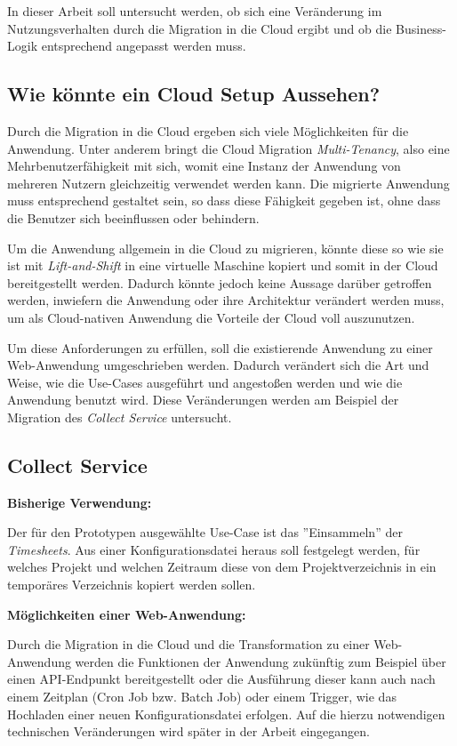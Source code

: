 In dieser Arbeit soll untersucht werden, ob sich eine Veränderung im Nutzungsverhalten durch die Migration in die Cloud ergibt und ob die Business-Logik entsprechend angepasst werden muss. \pagebreak

\subsection{Wie könnte ein Cloud Setup Aussehen?}
Durch die Migration in die Cloud ergeben sich viele Möglichkeiten für die Anwendung. Unter anderem bringt die Cloud Migration \textit{\gls{Multi-Tenancy}}, also eine Mehrbenutzerfähigkeit mit sich, womit eine Instanz der Anwendung von mehreren Nutzern gleichzeitig verwendet werden kann. Die migrierte Anwendung muss entsprechend gestaltet sein, so dass diese Fähigkeit gegeben ist, ohne dass die Benutzer sich beeinflussen oder behindern.

Um die Anwendung allgemein in die Cloud zu migrieren, könnte diese so wie sie ist mit \textit{Lift-and-Shift} in eine virtuelle Maschine kopiert und somit in der Cloud bereitgestellt werden. Dadurch könnte jedoch keine Aussage darüber getroffen werden, inwiefern die Anwendung oder ihre Architektur verändert werden muss, um als Cloud-nativen Anwendung die Vorteile der Cloud voll auszunutzen.

Um diese Anforderungen zu erfüllen, soll die existierende Anwendung zu einer Web-Anwendung umgeschrieben werden. Dadurch verändert sich die Art und Weise, wie die Use-Cases ausgeführt und angestoßen werden und wie die Anwendung benutzt wird. Diese Veränderungen werden am Beispiel der Migration des \textit{Collect Service} untersucht.

\subsection{Collect Service}
\textbf{Bisherige Verwendung:}

Der für den Prototypen ausgewählte Use-Case ist das ''Einsammeln'' der \textit{\glspl{Timesheet}}. Aus einer Konfigurationsdatei heraus soll festgelegt werden, für welches Projekt und welchen Zeitraum diese von dem Projektverzeichnis in ein temporäres Verzeichnis kopiert werden sollen. 

\textbf{Möglichkeiten einer Web-Anwendung:}

Durch die Migration in die Cloud und die Transformation zu einer Web-Anwendung werden die Funktionen der Anwendung zukünftig zum Beispiel über einen API-Endpunkt bereitgestellt oder die Ausführung dieser kann auch nach einem Zeitplan (Cron Job bzw. Batch Job) oder einem Trigger, wie das Hochladen einer neuen Konfigurationsdatei erfolgen. Auf die hierzu notwendigen technischen Veränderungen wird später in der Arbeit eingegangen. \pagebreak

